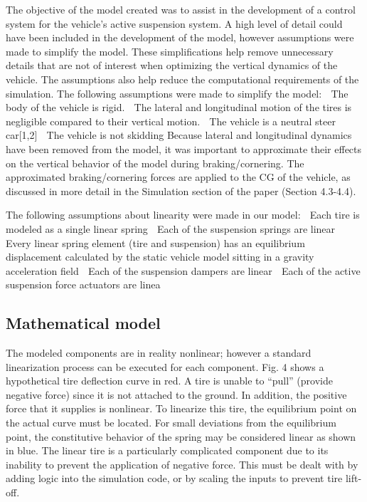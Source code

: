 \documentclass[10pt,twocolumn]{witseiepaper}
\begin{document}
The objective of the model created was to assist in 
the development of a control system for the vehicle’s 
active suspension system. A high level of detail 
could have been included in the development of the 
model, however assumptions were made to simplify 
the model. These simplifications help remove 
unnecessary details that are not of interest when 
optimizing the vertical dynamics of the vehicle. The 
assumptions also help reduce the computational 
requirements of the simulation. 
The following assumptions were made to simplify the 
model: 
 The body of the vehicle is rigid. 
 The lateral and longitudinal motion of the 
tires is negligible compared to their 
vertical motion. 
 The vehicle is a neutral steer car[1,2] 
 The vehicle is not skidding 
Because lateral and longitudinal dynamics have been 
removed from the model, it was important to 
approximate their effects on the vertical behavior of 
the model during braking/cornering. The 
approximated braking/cornering forces are applied to 
the CG of the vehicle, as discussed in more detail in 
the Simulation section of the paper (Section 4.3-4.4). 


The following assumptions about linearity were made 
in our model: 
 Each tire is modeled as a single linear spring 
 Each of the suspension springs are linear 
 Every linear spring element (tire and 
suspension) has an equilibrium displacement 
calculated by the static vehicle model sitting 
in a gravity acceleration field 
 Each of the suspension dampers are linear 
 Each of the active suspension force actuators 
are linea

\subsection{Mathematical model}

The modeled components are in reality nonlinear; 
however a standard linearization process can be 
executed for each component. Fig. 4 shows a 
hypothetical tire deflection curve in red. A tire is 
unable to “pull” (provide negative force) since it is 
not attached to the ground. In addition, the positive 
force that it supplies is nonlinear. To linearize this 
tire, the equilibrium point on the actual curve must be 
located. For small deviations from the equilibrium 
point, the constitutive behavior of the spring may be considered linear as shown in blue. The linear tire is 
a particularly complicated component due to its 
inability to prevent the application of negative force. 
This must be dealt with by adding logic into the 
simulation code, or by scaling the inputs to prevent 
tire lift-off.
\end{document}

